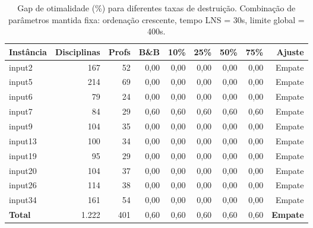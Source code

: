 \begin{table}[htbp]
\centering
\caption{Gap de otimalidade (\%) para diferentes taxas de destruição. Combinação de parâmetros mantida fixa: ordenação crescente, tempo LNS = 30s, limite global = 400s.}
\label{tab:lns_cand_gap}
\small
\begin{tabular}{@{}lrrrrrrrr@{}}
\toprule
\textbf{Instância} & \textbf{Disciplinas} & \textbf{Profs} & \textbf{B\&B} & \textbf{10\%} & \textbf{25\%} & \textbf{50\%} & \textbf{75\%} & \textbf{Ajuste} \\
\midrule
input2  & 167 & 52 & 0,00 & 0,00 & 0,00 & 0,00 & 0,00 & Empate \\
input5  & 214 & 69 & 0,00 & 0,00 & 0,00 & 0,00 & 0,00 & Empate \\
input6  & 79  & 24 & 0,00 & 0,00 & 0,00 & 0,00 & 0,00 & Empate \\
input7  & 84  & 29 & 0,60 & 0,60 & 0,60 & 0,60 & 0,60 & Empate \\
input9  & 104 & 35 & 0,00 & 0,00 & 0,00 & 0,00 & 0,00 & Empate \\
input13 & 100 & 34 & 0,00 & 0,00 & 0,00 & 0,00 & 0,00 & Empate \\
input19 & 95  & 29 & 0,00 & 0,00 & 0,00 & 0,00 & 0,00 & Empate \\
input20 & 104 & 37 & 0,00 & 0,00 & 0,00 & 0,00 & 0,00 & Empate \\
input26 & 114 & 38 & 0,00 & 0,00 & 0,00 & 0,00 & 0,00 & Empate \\
input34 & 161 & 54 & 0,00 & 0,00 & 0,00 & 0,00 & 0,00 & Empate \\
\midrule
\textbf{Total}  & 1.222 & 401 & 0,60 & 0,60 & 0,60 & 0,60 & 0,60 & \textbf{Empate} \\
\bottomrule
\end{tabular}
\end{table}
